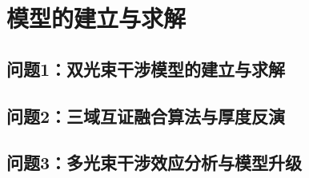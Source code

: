 \section{模型的建立与求解}

\subsection{问题1：双光束干涉模型的建立与求解}





\subsection{问题2：三域互证融合算法与厚度反演}



\subsection{问题3：多光束干涉效应分析与模型升级}

